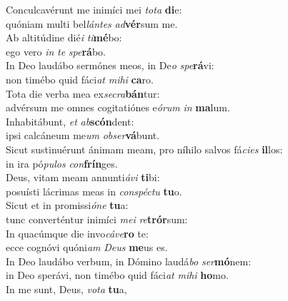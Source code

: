 \evenverse Conculcavérunt me inimíci mei \textit{to}\textit{ta} \textbf{di}e:~\*\\
\evenverse quóniam multi bel\textit{lán}\textit{tes} \textit{ad}\textbf{vér}sum me.\\
\oddverse Ab altitúdine dié\textit{i} \textit{ti}\textbf{mé}bo:~\*\\
\oddverse ego vero \textit{in} \textit{te} \textit{spe}\textbf{rá}bo.\\
\evenverse In Deo laudábo sermónes meos, in De\textit{o} \textit{spe}\textbf{rá}vi:~\*\\
\evenverse non timébo quid fáci\textit{at} \textit{mi}\textit{hi} \textbf{ca}ro.\\
\oddverse Tota die verba mea ex\textit{se}\textit{cra}\textbf{bán}tur:~\*\\
\oddverse advérsum me omnes cogitatiónes e\textit{ó}\textit{rum} \textit{in} \textbf{ma}lum.\\
\evenverse Inhabitábunt, \textit{et} \textit{ab}\textbf{scón}dent:~\*\\
\evenverse ipsi calcáneum me\textit{um} \textit{ob}\textit{ser}\textbf{vá}bunt.\\
\oddverse Sicut sustinuérunt ánimam meam, pro níhilo salvos fá\textit{ci}\textit{es} \textbf{il}los:~\*\\
\oddverse in ira pó\textit{pu}\textit{los} \textit{con}\textbf{frín}ges.\\
\evenverse Deus, vitam meam annunti\textit{á}\textit{vi} \textbf{ti}bi:~\*\\
\evenverse posuísti lácrimas meas in \textit{con}\textit{spé}\textit{ctu} \textbf{tu}o.\\
\oddverse Sicut et in promissi\textit{ó}\textit{ne} \textbf{tu}a:~\*\\
\oddverse tunc converténtur inimíci \textit{me}\textit{i} \textit{re}\textbf{trór}sum:\\
\evenverse In quacúmque die invo\textit{cá}\textit{ve}\textbf{ro} te:~\*\\
\evenverse ecce cognóvi quóni\textit{am} \textit{De}\textit{us} \textbf{me}us es.\\
\oddverse In Deo laudábo verbum, in Dómino laudá\textit{bo} \textit{ser}\textbf{mó}nem:~\*\\
\oddverse in Deo sperávi, non timébo quid fáci\textit{at} \textit{mi}\textit{hi} \textbf{ho}mo.\\
\evenverse In me sunt, Deus, \textit{vo}\textit{ta} \textbf{tu}a,~\*\\
